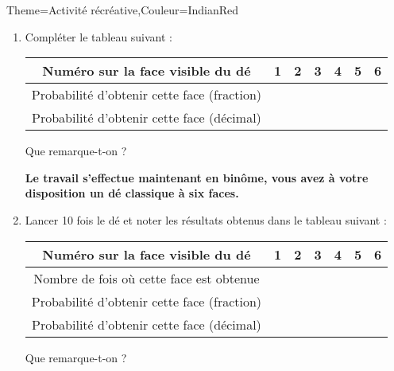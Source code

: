 \begin{Maquette}[Cours]{Theme={Activité récréative},Couleur={IndianRed}}
    

      {
      \begin{enumerate}
         \item Compléter le tableau suivant : \par
            \begin{tabular}{|c|*{6}{C{1}|}}
               \hline
               Numéro sur la face visible du dé & 1 & 2 & 3 & 4 & 5 & 6 \\
               \hline
               Probabilité d'obtenir cette face (fraction) & & & & & & \\
               \hline
               Probabilité d'obtenir cette face (décimal) & & & & & & \\
               \hline
            \end{tabular} \par \bigskip
            Que remarque-t-on ? \pointilles

         \vfill

         {\bf Le travail s'effectue maintenant en binôme, vous avez à votre disposition un dé classique à six faces.}

         \vfill

         \item Lancer 10 fois le dé et noter les résultats obtenus dans le tableau suivant : \par \smallskip
            \begin{tabular}{|c|*{6}{C{1}|}}
               \hline
               Numéro sur la face visible du dé & 1 & 2 & 3 & 4 & 5 & 6 \\
               \hline
               Nombre de fois où cette face est obtenue & & & & & & \\
               \hline
               Probabilité d'obtenir cette face (fraction) & & & & & & \\
               \hline
               Probabilité d'obtenir cette face (décimal) & & & & & & \\
               \hline
            \end{tabular} \par \bigskip
            Que remarque-t-on ? \pointilles

         \vfill


\end{enumerate}}
\end{Maquette}

